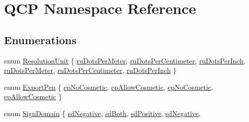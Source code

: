 \hypertarget{namespace_q_c_p}{}\section{Q\+CP Namespace Reference}
\label{namespace_q_c_p}
\subsection*{Enumerations}
\begin{DoxyCompactItemize}
\item 
enum \hyperlink{namespace_q_c_p_a715d46153da230990aa887d0f0602452}{Resolution\+Unit} \{ \newline
\hyperlink{namespace_q_c_p_a715d46153da230990aa887d0f0602452a35bd2504f1a53bae238cc860a6302e33}{ru\+Dots\+Per\+Meter}, 
\hyperlink{namespace_q_c_p_a715d46153da230990aa887d0f0602452a02d47fd51bd0b99ae0b1cc6703646817}{ru\+Dots\+Per\+Centimeter}, 
\hyperlink{namespace_q_c_p_a715d46153da230990aa887d0f0602452a9def6fd83de9b4108ad999541a42ac6a}{ru\+Dots\+Per\+Inch}, 
\hyperlink{namespace_q_c_p_a715d46153da230990aa887d0f0602452a35bd2504f1a53bae238cc860a6302e33}{ru\+Dots\+Per\+Meter}, 
\newline
\hyperlink{namespace_q_c_p_a715d46153da230990aa887d0f0602452a02d47fd51bd0b99ae0b1cc6703646817}{ru\+Dots\+Per\+Centimeter}, 
\hyperlink{namespace_q_c_p_a715d46153da230990aa887d0f0602452a9def6fd83de9b4108ad999541a42ac6a}{ru\+Dots\+Per\+Inch}
 \}
\item 
enum \hyperlink{namespace_q_c_p_a17844f19e1019693a953e1eb93536d2f}{Export\+Pen} \{ \hyperlink{namespace_q_c_p_a17844f19e1019693a953e1eb93536d2faec51f17ee42178094138e69ac73daa52}{ep\+No\+Cosmetic}, 
\hyperlink{namespace_q_c_p_a17844f19e1019693a953e1eb93536d2fa34716c7388ad3a2ff3ac27e57fb83a5b}{ep\+Allow\+Cosmetic}, 
\hyperlink{namespace_q_c_p_a17844f19e1019693a953e1eb93536d2faec51f17ee42178094138e69ac73daa52}{ep\+No\+Cosmetic}, 
\hyperlink{namespace_q_c_p_a17844f19e1019693a953e1eb93536d2fa34716c7388ad3a2ff3ac27e57fb83a5b}{ep\+Allow\+Cosmetic}
 \}
\item 
enum \hyperlink{namespace_q_c_p_afd50e7cf431af385614987d8553ff8a9}{Sign\+Domain} \{ \newline
\hyperlink{namespace_q_c_p_afd50e7cf431af385614987d8553ff8a9a0b464fa3135be2808909739a969193c9}{sd\+Negative}, 
\hyperlink{namespace_q_c_p_afd50e7cf431af385614987d8553ff8a9a3dee7e9cd2fedce9253b83e172626a6c}{sd\+Both}, 
\hyperlink{namespace_q_c_p_afd50e7cf431af385614987d8553ff8a9a23362334a52289677a51526a9b68db6c}{sd\+Positive}, 
\hyperlink{namespace_q_c_p_afd50e7cf431af385614987d8553ff8a9a0b464fa3135be2808909739a969193c9}{sd\+Negative}, 

\end{DoxyCompactItemize}
